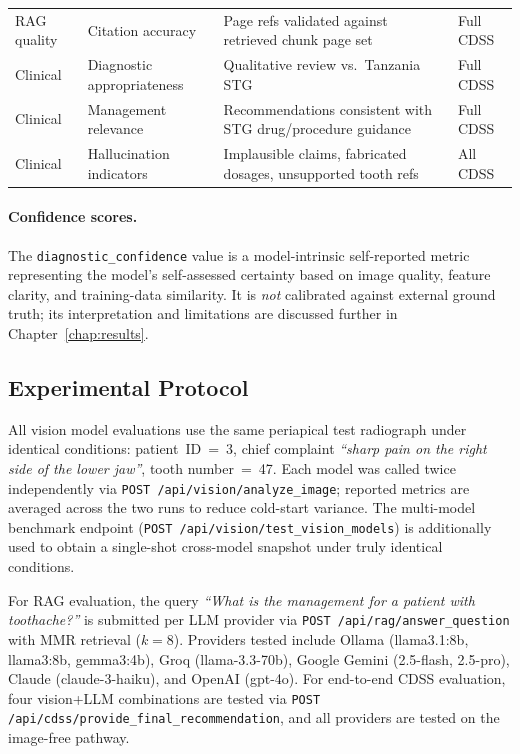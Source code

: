 \documentclass[12pt,a4paper]{report}
\begin{document}
\begin{table}[H]
\begin{tabularx}{\textwidth}{@{}l l X l@{}}
RAG quality   & Citation accuracy            & Page refs validated against retrieved chunk page set         & Full CDSS \\
Clinical      & Diagnostic appropriateness   & Qualitative review vs.\ Tanzania STG                         & Full CDSS \\
Clinical      & Management relevance         & Recommendations consistent with STG drug/procedure guidance  & Full CDSS \\
Clinical      & Hallucination indicators     & Implausible claims, fabricated dosages, unsupported tooth refs & All CDSS \\
\bottomrule
\end{tabularx}
\end{table}

\paragraph{Confidence scores.}
The \texttt{diagnostic\_confidence} value is a model-intrinsic
self-reported metric representing the model's self-assessed certainty
based on image quality, feature clarity, and training-data similarity.
It is \emph{not} calibrated against external ground truth; its
interpretation and limitations are discussed further in Chapter~\ref{chap:results}.

\subsection{Experimental Protocol}
\label{subsec:protocol}

All vision model evaluations use the same periapical test radiograph
under identical conditions: patient~ID~=~3, chief complaint
\textit{``sharp pain on the right side of the lower jaw''}, tooth
number~=~47.  Each model was called twice independently via
\texttt{POST /api/vision/analyze\_image}; reported metrics are averaged
across the two runs to reduce cold-start variance.  The multi-model
benchmark endpoint (\texttt{POST /api/vision/test\_vision\_models}) is
additionally used to obtain a single-shot cross-model snapshot under
truly identical conditions.

For RAG evaluation, the query \textit{``What is the management for a
patient with toothache?''} is submitted per LLM provider via
\texttt{POST /api/rag/answer\_question} with MMR retrieval ($k{=}8$).
Providers tested include Ollama (llama3.1:8b, llama3:8b, gemma3:4b),
Groq (llama-3.3-70b), Google Gemini (2.5-flash, 2.5-pro), Claude
(claude-3-haiku), and OpenAI (gpt-4o).  For end-to-end CDSS evaluation,
four vision+LLM combinations are tested via
\texttt{POST /api/cdss/provide\_final\_recommendation}, and all providers
are tested on the image-free pathway.
\end{document}
